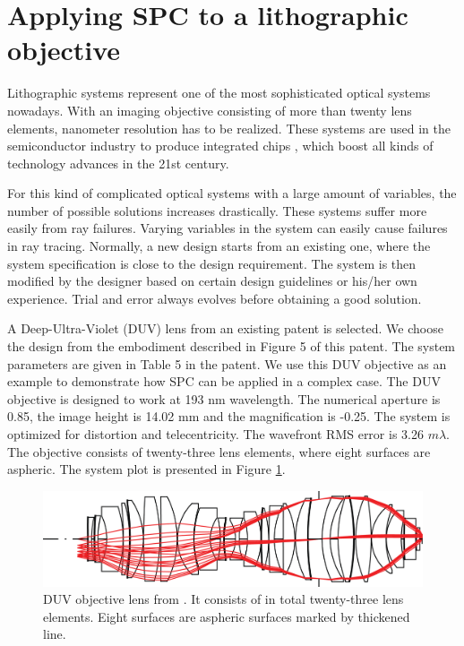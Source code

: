 \section{Applying SPC to a lithographic objective}
Lithographic systems represent one of the most sophisticated optical systems nowadays. With an imaging objective consisting of more than twenty lens elements, nanometer resolution has to be realized. These systems are used in the semiconductor industry to produce integrated chips \cite{Matsuyama2006_LithoHis}, which boost all kinds of technology advances in the 21st century. 

For this kind of complicated optical systems with a large amount of variables, the number of possible solutions increases drastically. These systems suffer more easily from ray failures. Varying variables in the system can easily cause failures in ray tracing. Normally, a new design starts from an existing one, where the system specification is close to the design requirement. The system is then modified by the designer based on certain design guidelines \cite{LivshitsQA2013}\cite{Shafer1995_moreless}\cite{Cao2017_GroupDesign} or his/her own experience. Trial and error always evolves before obtaining a good solution. 

A Deep-Ultra-Violet (DUV) lens from an existing patent \cite{patentZeissDUV} is selected. We choose the design from the embodiment described in Figure 5 of this patent. The system parameters are given in Table 5 in the patent. We use this DUV objective as an example to demonstrate how SPC can be applied in a complex case. The DUV objective is designed to work at 193 nm wavelength. The numerical aperture is 0.85, the image height is 14.02 mm and the magnification is -0.25. The system is optimized for distortion and telecentricity. The wavefront RMS error is 3.26 $m\lambda$. The objective consists of twenty-three lens elements, where eight surfaces are aspheric. The system plot is presented in Figure \ref{fig: litho_DUV_plot}. 
\begin{figure}[h!]
    \centering
    \includegraphics[width=\textwidth]{chapter-4/figures/Litho_DUV_plot.png}
    \caption{DUV objective lens from \cite{patentZeissDUV}. It consists of in total twenty-three lens elements. Eight surfaces are aspheric surfaces marked by thickened line.}
    \label{fig: litho_DUV_plot}
\end{figure}

